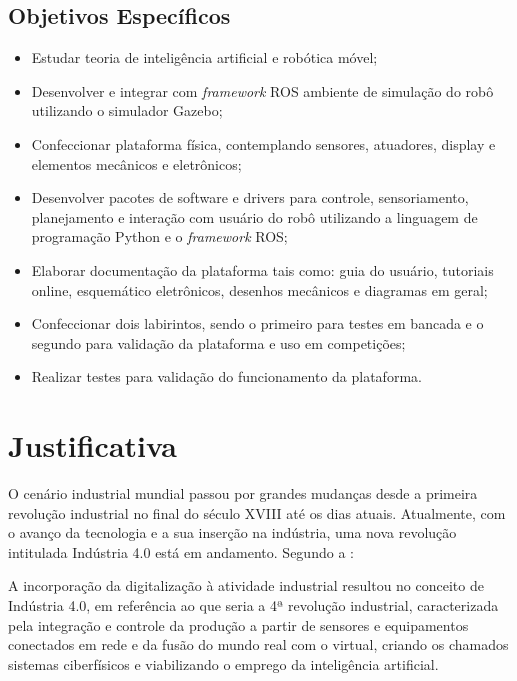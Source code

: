 \subsection{Objetivos Específicos}
\label{ssec:objesp}
\begin{itemize}
	\item Estudar teoria de inteligência artificial e robótica móvel;
	\item Desenvolver e integrar com \textit{framework} ROS ambiente de simulação do robô utilizando o simulador Gazebo;
	\item Confeccionar plataforma física, contemplando sensores, atuadores, display e elementos mecânicos e eletrônicos;
	\item Desenvolver pacotes de software e drivers para controle, sensoriamento, planejamento e interação com usuário do robô utilizando a linguagem de programação Python e o \textit{framework} ROS;
	\item Elaborar documentação da plataforma tais como: guia do usuário, tutoriais online, esquemático eletrônicos, desenhos mecânicos e diagramas em geral;
	\item Confeccionar dois labirintos, sendo o primeiro para testes em bancada e o segundo para validação da plataforma e uso em competições;
	\item Realizar testes para validação do funcionamento da plataforma. 
	
\end{itemize}

\section{Justificativa}
\label{sec:justificativa}
O cenário industrial mundial passou por grandes mudanças desde a primeira revolução industrial no final do século XVIII até os dias atuais. Atualmente, com o avanço da tecnologia e a sua inserção na indústria, uma nova revolução intitulada Indústria 4.0 está em andamento. Segundo a :
\begin{quoting}[rightmargin=0cm,leftmargin=4cm]
\begin{singlespace}
{\footnotesize
A incorporação da digitalização à atividade industrial resultou no conceito de Indústria 4.0, em referência ao que seria a 4ª revolução industrial, caracterizada pela integração e controle da produção a partir de sensores e equipamentos conectados em rede e da fusão do mundo real com o virtual, criando os chamados sistemas ciberfísicos e viabilizando o emprego da inteligência artificial.
}
\end{singlespace}
\end{quoting}


